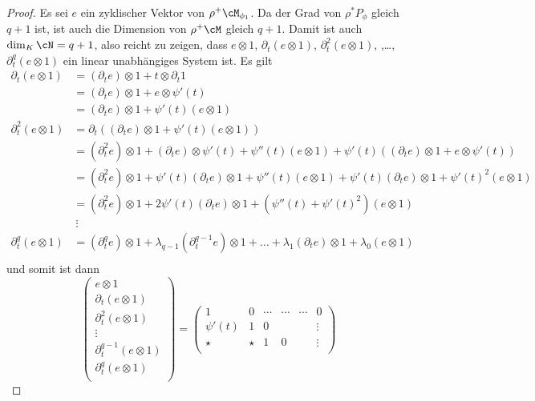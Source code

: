 \begin{proof}
Es sei $e$ ein zyklischer Vektor von $\rho^+\cM_{\phi_1}$.
Da der Grad von $\rho^*P_{\phi}$ gleich $q+1$ ist, ist auch die Dimension von
$\rho^+\cM$ gleich $q+1$. Damit ist auch $\dim_K\cN=q+1$, also reicht zu
zeigen, dass $e\otimes 1$, $\partial_t(e\otimes 1)$, $\partial_t^2(e\otimes
1)$, ,\dots, $\partial_t^{q}(e\otimes 1)$ ein linear unabhängiges System ist.
Es gilt
\begin{align*}
\partial_t(e\otimes 1) &= (\partial_t e)\otimes 1 + t\otimes \partial_t 1\\
  &= (\partial_t e)\otimes 1 + e\otimes \psi'(t)\\
  &= (\partial_t e)\otimes 1 +  \psi'(t)(e\otimes 1)\\
\partial_t^2(e\otimes 1) &= \partial_t((\partial_t e)\otimes 1 +
    \psi'(t)(e\otimes 1))\\
  &= (\partial_t^2 e)\otimes 1 + (\partial_t e)\otimes \psi'(t)
  + \psi''(t)(e\otimes 1)
  + \psi'(t)((\partial_t e)\otimes 1 + e\otimes \psi'(t))\\
  &= (\partial_t^2 e)\otimes 1
  + \psi'(t)(\partial_t e)\otimes 1
  + \psi''(t)(e\otimes 1)
  + \psi'(t)(\partial_t e)\otimes 1
  + \psi'(t)^2(e\otimes 1)\\
  &= (\partial_t^2 e)\otimes 1
  + 2\psi'(t)(\partial_t e)\otimes 1
  + (\psi''(t) + \psi'(t)^2)(e\otimes 1)\\
  &~\vdots\\
\partial_t^{q}(e\otimes 1) &= (\partial_t^q e)\otimes 1
  + \lambda_{q-1}(\partial_t^{q-1} e)\otimes 1
  +\dots
  + \lambda_{1}(\partial_t e)\otimes 1
  + \lambda_0(e\otimes 1)\\
\end{align*}
und somit ist dann
\[
\begin{pmatrix}
e\otimes 1\\
\partial_t(e\otimes 1)\\
\partial_t^2(e\otimes 1)\\
\vdots\\
\partial_t^{q-1}(e\otimes 1)\\
\partial_t^{q}(e\otimes 1)\\
\end{pmatrix}
=
\begin{pmatrix}
1         & 0         & \cdots & \cdots & \cdots        & 0 \\
\psi'(t)  & 1         & 0      &        &               & \vdots\\
\star     & \star     & 1      & 0      &               & \vdots\\

\end{pmatrix}\]
\end{proof}

